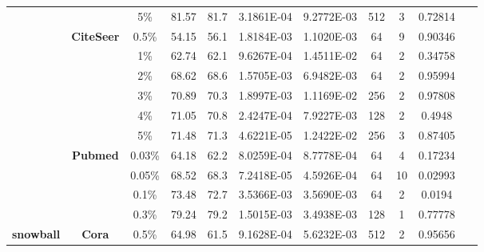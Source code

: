 \begin{table}[htbp]
\begin{tabular}{ccccc|cccccc}
          &       & 5\%   & \cellcolor[rgb]{ .973,  .412,  .42}81.57 & \cellcolor[rgb]{ .388,  .745,  .482}81.7 & 3.1861E-04 & 9.2772E-03 & 512   & 3     & 0.72814 & ~ \\
          & \multirow{6}[0]{*}{\textbf{CiteSeer}} & 0.5\% & \cellcolor[rgb]{ .973,  .412,  .42}54.15 & \cellcolor[rgb]{ .388,  .745,  .482}56.1 & 1.8184E-03 & 1.1020E-03 & 64    & 9     & 0.90346 & ~ \\
          &       & 1\%   & \cellcolor[rgb]{ .388,  .745,  .482}62.74 & \cellcolor[rgb]{ .973,  .412,  .42}62.1 & 9.6267E-04 & 1.4511E-02 & 64    & 2     & 0.34758 & ~ \\
          &       & 2\%   & \cellcolor[rgb]{ .388,  .745,  .482}68.62 & \cellcolor[rgb]{ .973,  .412,  .42}68.6 & 1.5705E-03 & 6.9482E-03 & 64    & 2     & 0.95994 & ~ \\
          &       & 3\%   & \cellcolor[rgb]{ .388,  .745,  .482}70.89 & \cellcolor[rgb]{ .973,  .412,  .42}70.3 & 1.8997E-03 & 1.1169E-02 & 256   & 2     & 0.97808 & ~ \\
          &       & 4\%   & \cellcolor[rgb]{ .388,  .745,  .482}71.05 & \cellcolor[rgb]{ .973,  .412,  .42}70.8 & 2.4247E-04 & 7.9227E-03 & 128   & 2     & 0.4948 & ~ \\
          &       & 5\%   & \cellcolor[rgb]{ .388,  .745,  .482}71.48 & \cellcolor[rgb]{ .973,  .412,  .42}71.3 & 4.6221E-05 & 1.2422E-02 & 256   & 3     & 0.87405 & ~ \\
          & \multirow{4}[1]{*}{\textbf{Pubmed}} & 0.03\% & \cellcolor[rgb]{ .388,  .745,  .482}64.18 & \cellcolor[rgb]{ .973,  .412,  .42}62.2 & 8.0259E-04 & 8.7778E-04 & 64    & 4     & 0.17234 & ~ \\
          &       & 0.05\% & \cellcolor[rgb]{ .388,  .745,  .482}68.52 & \cellcolor[rgb]{ .973,  .412,  .42}68.3 & 7.2418E-05 & 4.5926E-04 & 64    & 10    & 0.02993 & ~ \\
          &       & 0.1\% & \cellcolor[rgb]{ .388,  .745,  .482}73.48 & \cellcolor[rgb]{ .973,  .412,  .42}72.7 & 3.5366E-03 & 3.5690E-03 & 64    & 2     & 0.0194 & ~ \\
          &       & 0.3\% & \cellcolor[rgb]{ .388,  .745,  .482}79.24 & \cellcolor[rgb]{ .973,  .412,  .42}79.2 & 1.5015E-03 & 3.4938E-03 & 128   & 1     & 0.77778 & ~ \\
    \midrule
    \multirow{16}[2]{*}{\textbf{snowball}} & \multirow{6}[1]{*}{\textbf{Cora}} & 0.5\% & \cellcolor[rgb]{ .388,  .745,  .482}64.98 & \cellcolor[rgb]{ .973,  .412,  .42}61.5 & 9.1628E-04 & 5.6232E-03 & 512   & 2     & 0.95656 & ~ \\

\end{tabular}
\end{table}
